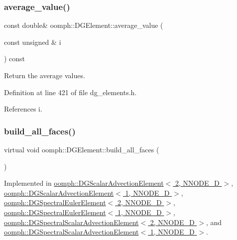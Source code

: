 \subsubsection{\texorpdfstring{average\+\_\+value()}{average\_value()}\hspace{0.1cm}{\footnotesize\ttfamily [2/2]}}
{\footnotesize\ttfamily const double\& oomph\+::\+D\+G\+Element\+::average\+\_\+value (\begin{DoxyParamCaption}\item[{const unsigned \&}]{i }\end{DoxyParamCaption}) const\hspace{0.3cm}{\ttfamily [inline]}}



Return the average values. 



Definition at line 421 of file dg\+\_\+elements.\+h.



References i.

\mbox{\label{classoomph_1_1DGElement_a4387d0837a07a2d5423896331c6c012a}} 
\subsubsection{\texorpdfstring{build\+\_\+all\+\_\+faces()}{build\_all\_faces()}}
{\footnotesize\ttfamily virtual void oomph\+::\+D\+G\+Element\+::build\+\_\+all\+\_\+faces (\begin{DoxyParamCaption}{ }\end{DoxyParamCaption})\hspace{0.3cm}{\ttfamily [pure virtual]}}



Implemented in \hyperlink{classoomph_1_1DGScalarAdvectionElement_3_012_00_01NNODE__1D_01_4_a467b719ab6fd88aaddade7e32a0cf354}{oomph\+::\+D\+G\+Scalar\+Advection\+Element$<$ 2, N\+N\+O\+D\+E\+\_\+D $>$}, \hyperlink{classoomph_1_1DGScalarAdvectionElement_3_011_00_01NNODE__1D_01_4_a18b03341945a2664a74f7b276e755439}{oomph\+::\+D\+G\+Scalar\+Advection\+Element$<$ 1, N\+N\+O\+D\+E\+\_\+D $>$}, \hyperlink{classoomph_1_1DGSpectralEulerElement_3_012_00_01NNODE__1D_01_4_ae9cdecdb217f91b99b24f960a1ab85ab}{oomph\+::\+D\+G\+Spectral\+Euler\+Element$<$ 2, N\+N\+O\+D\+E\+\_\+D $>$}, \hyperlink{classoomph_1_1DGSpectralEulerElement_3_011_00_01NNODE__1D_01_4_a79e06bb38c84bae756597dc885a687ac}{oomph\+::\+D\+G\+Spectral\+Euler\+Element$<$ 1, N\+N\+O\+D\+E\+\_\+D $>$}, \hyperlink{classoomph_1_1DGSpectralScalarAdvectionElement_3_012_00_01NNODE__1D_01_4_a90e5d17dfbd134b9f9be110a7ab9085b}{oomph\+::\+D\+G\+Spectral\+Scalar\+Advection\+Element$<$ 2, N\+N\+O\+D\+E\+\_\+D $>$}, and \hyperlink{classoomph_1_1DGSpectralScalarAdvectionElement_3_011_00_01NNODE__1D_01_4_ac52a57b0eb393440d0a182260cfc1ce3}{oomph\+::\+D\+G\+Spectral\+Scalar\+Advection\+Element$<$ 1, N\+N\+O\+D\+E\+\_\+D $>$}.

